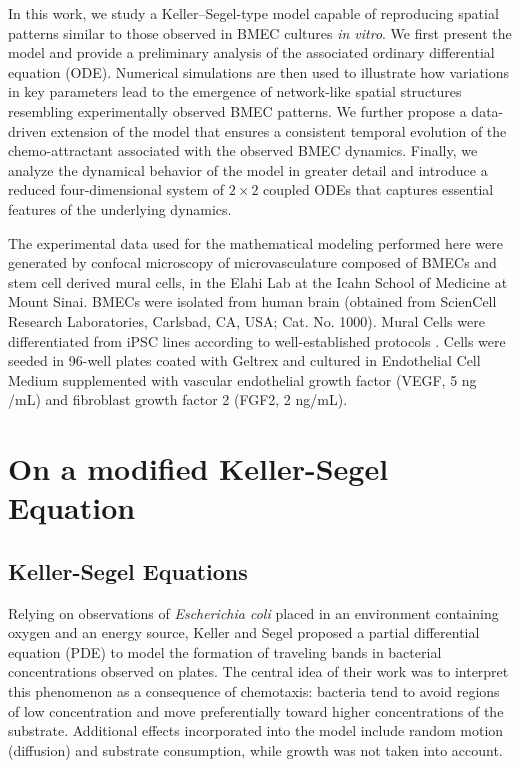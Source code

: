 \documentclass[final,1p,times]{elsarticle}
\begin{document}
In this work, we study a Keller–Segel-type model capable of reproducing spatial patterns similar to those observed in BMEC cultures \textit{ in vitro}. We first present the model and provide a preliminary analysis of the associated ordinary differential equation (ODE). Numerical simulations are then used to illustrate how variations in key parameters lead to the emergence of network-like spatial structures resembling experimentally observed BMEC patterns. We further propose a data-driven extension of the model that ensures a consistent temporal evolution of the chemo-attractant associated with the observed BMEC dynamics. Finally, we analyze the dynamical behavior of the model in greater detail and introduce a reduced four-dimensional system of $2\times2$ coupled ODEs that captures essential features of the underlying dynamics.

The experimental data used for the mathematical modeling performed here were generated by confocal microscopy of microvasculature composed of  BMECs and stem cell derived mural cells, in the Elahi Lab at the Icahn School of Medicine at Mount Sinai. BMECs were isolated from human brain (obtained from ScienCell Research Laboratories, Carlsbad, CA, USA; Cat. No. 1000). Mural Cells were differentiated from iPSC lines according to well-established protocols \cite{Blanchard2020APOE4,Lippmann2012BBB,Stanton2025miBrain}. Cells were seeded in 96-well plates coated with Geltrex and cultured in Endothelial Cell Medium supplemented with vascular endothelial growth factor (VEGF, 5 ng /mL) and fibroblast growth factor 2 (FGF2, 2 ng/mL).




\section{On a modified Keller-Segel Equation}
\subsection{Keller-Segel Equations}
Relying on observations of \textit{Escherichia coli} placed in an environment containing oxygen and an energy source, Keller and Segel \cite{Kel1971} proposed a partial differential equation (PDE) to model the formation of traveling bands in bacterial concentrations observed on plates. The central idea of their work was to interpret this phenomenon as a consequence of chemotaxis: bacteria tend to avoid regions of low concentration and move preferentially toward higher concentrations of the substrate. Additional effects incorporated into the model include random motion (diffusion) and substrate consumption, while growth was not taken into account.
\end{document}
